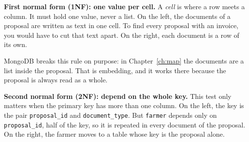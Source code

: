 \textbf{First normal form (1NF): one value per cell.} A \emph{cell} is where
a row meets a column. It must hold one value, never a list. On the left, the
documents of a proposal are written as text in one cell. To find every
proposal with an invoice, you would have to cut that text apart. On the
right, each document is a row of its own.

\begin{center}
\end{center}

MongoDB breaks this rule on purpose: in Chapter~\ref{ch:map} the documents
are a list inside the proposal. That is embedding, and it works there
because the proposal is always read as a whole.

\textbf{Second normal form (2NF): depend on the whole key.} This test only
matters when the primary key has more than one column. On the left, the key
is the pair \texttt{proposal\_id} and \texttt{document\_type}. But
\texttt{farmer} depends only on \texttt{proposal\_id}, half of the key, so it
is repeated in every document of the proposal. On the right, the farmer moves
to a table whose key is the proposal alone.

